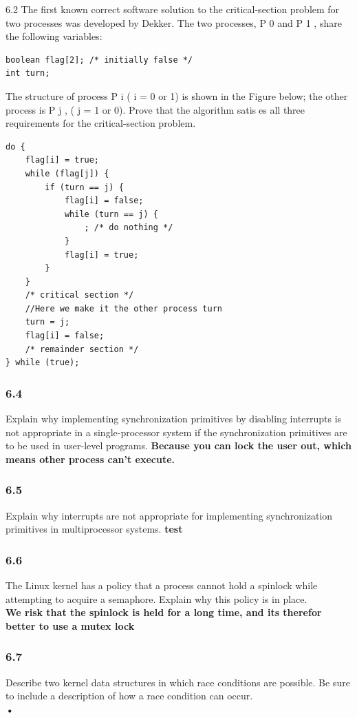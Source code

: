 \documentclass[a4paper,10pt,titlepage]{report}
\begin{document}
6.2 The first known correct software solution to the critical-section problem for two processes was developed by Dekker. The two processes, P 0 and P 1 , share the following variables:
\begin{lstlisting}[frame=single]
boolean flag[2]; /* initially false */
int turn;
\end{lstlisting}
The structure of process P i ( i = 0 or 1) is shown in the Figure below; the other process is P j , ( j = 1 or 0). Prove that the algorithm satises all three requirements for the critical-section problem.\\
\begin{lstlisting}[frame=single]
do {
    flag[i] = true;
    while (flag[j]) {
        if (turn == j) {
            flag[i] = false;
            while (turn == j) {
                ; /* do nothing */
            }
            flag[i] = true;
        }
    }
    /* critical section */
    //Here we make it the other process turn
    turn = j;
    flag[i] = false;
    /* remainder section */
} while (true);

\end{lstlisting}

\subsubsection{6.4} 
Explain why implementing synchronization primitives by disabling interrupts is not appropriate in a single-processor system if the synchronization primitives are to be used in user-level programs.
\textbf{Because you can lock the user out, which means other process can't execute.}
\\
\subsubsection{6.5} 
Explain why interrupts are not appropriate for implementing synchronization primitives in multiprocessor systems.
\textbf{test}
\\
\subsubsection{6.6} 
The Linux kernel has a policy that a process cannot hold a spinlock while attempting to acquire a semaphore. Explain why this policy is in place.\\
\textbf{We risk that the spinlock is held for a long time, and its therefor better to use a mutex lock}
\\
\subsubsection{6.7}
Describe two kernel data structures in which race conditions are possible. Be sure to include a description of how a race condition can occur.\\
\textbf{•}
\\
\end{document}
